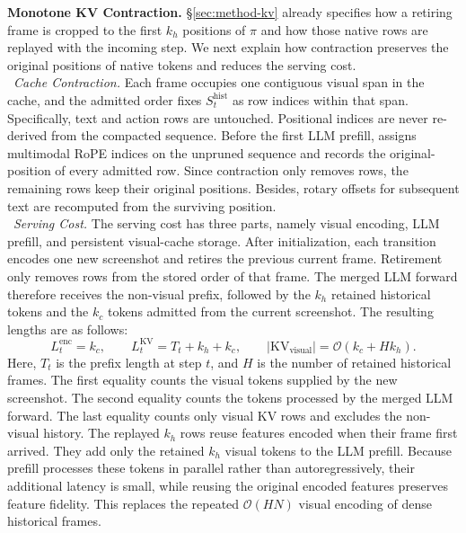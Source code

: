 \noindent\textbf{Monotone KV Contraction.}
\S\ref{sec:method-kv} already specifies how a retiring frame is cropped to the first $k_h$ positions of $\pi$ and how those native rows are replayed with the incoming step.
%
We next explain how contraction preserves the original positions of native tokens and reduces the serving cost.
\\
\noindent{}~\textit{Cache Contraction.}
Each frame occupies one contiguous visual span in the cache, and the admitted order fixes $S_t^{\mathrm{hist}}$ as row indices within that span.
%
Specifically, text and action rows are untouched.
%
Positional indices are never re-derived from the compacted sequence.
%
Before the first LLM prefill, \kvr{} assigns multimodal RoPE indices on the unpruned sequence and records the original-position of every admitted row.
%
Since contraction only removes rows, the remaining rows keep their original positions.
%
Besides, rotary offsets for subsequent text are recomputed from the surviving position.
\\
\noindent{}~\textit{Serving Cost.}
The serving cost has three parts, namely visual encoding, LLM prefill, and persistent visual-cache storage.
%
After initialization, each transition encodes one new screenshot and retires the previous current frame.
%
Retirement only removes rows from the stored order of that frame.
%
The merged LLM forward therefore receives the non-visual prefix, followed by the $k_h$ retained historical tokens and the $k_c$ tokens admitted from the current screenshot.
%
The resulting lengths are as follows:
\begin{equation}
L_t^{\mathrm{enc}}=k_c,\qquad
L_t^{\mathrm{KV}}=T_t+k_h+k_c,\qquad
|\mathrm{KV}_{\mathrm{visual}}|=\mathcal{O}(k_c+Hk_h).
\label{eq:accounting}
\end{equation}
Here, $T_t$ is the prefix length at step $t$, and $H$ is the number of retained historical frames.
%
The first equality counts the visual tokens supplied by the new screenshot.
%
The second equality counts the tokens processed by the merged LLM forward.
%
The last equality counts only visual KV rows and excludes the non-visual history.
%
The replayed $k_h$ rows reuse features encoded when their frame first arrived.
%
They add only the retained $k_h$ visual tokens to the LLM prefill.
%
Because prefill processes these tokens in parallel rather than autoregressively, their additional latency is small, while reusing the original encoded features preserves feature fidelity.
%
This replaces the repeated $\mathcal{O}(HN)$ visual encoding of dense historical frames.
